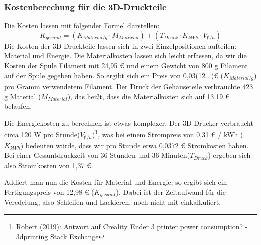 \subsubsection{Kostenberechung für die 3D-Druckteile}\label{ku_kosten_druck}
\noindent Die Kosten lassen mit folgender Formel darstellen:\\
\[
K_{gesamt} =  (K_{Material/g} \cdot M_{Material}) +  (T_{Druck} \cdot  K_{kWh} \cdot V_{\emptyset/h})
\]
Die Kosten der 3D-Druckteile lassen sich in zwei Einzelpositionen aufteilen: Material und Energie.
Die Materialkosten lassen sich leicht erfassen, da wir die Kosten der Spule Filament mit 24,95 \euro{} und einem Gewicht von 800 g Filament auf der Spule gegeben haben.
So ergibt sich ein Preis von 0,03(12...)\euro{} ($K_{Material/g}$) pro Gramm verwendetem Filament.
Der Druck der Gehäuseteile verbrauchte 423 g Material ($M_{Material}$), das heißt, dass die Materialkosten sich auf 13,19 \euro{} belaufen.\par
\noindent Die Energiekosten zu berechnen ist etwas komplexer.
Der 3D-Drucker verbraucht circa 120 W pro Stunde($V_{\emptyset/h}$)\footnote{Robert (2019): Antwort auf Creality Ender 3 printer power consumption? - 3dprinting Stack Exchange}, was bei einem Strompreis von 0,31 \euro{} / kWh ($K_{kWh}$) bedeuten würde, dass wir pro Stunde etwa 0,0372 \euro{} Stromkosten haben. 
Bei einer Gesamtdruckzeit von 36 Stunden und 36 Minuten($T_{Druck}$) ergeben sich also Stromkosten von 1,37 \euro{}.\par
\noindent Addiert man nun die Kosten für Material und Energie, so ergibt sich ein Fertigungspreis von 12,98 \euro{} ($K_{gesamt}$). 
Dabei ist der Zeitaufwand für die Veredelung, also Schleifen und Lackieren, noch nicht mit einkalkuliert.\par